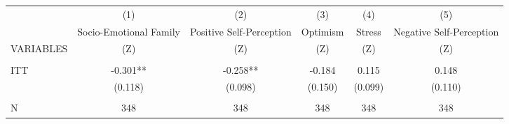 \begin{tabular}{lccccc} \hline
 & (1) & (2) & (3) & (4) & (5) \\
 & Socio-Emotional Family & Positive Self-Perception & Optimism & Stress & Negative Self-Perception \\
VARIABLES & (Z) & (Z) & (Z) & (Z) & (Z) \\ \hline
 &  &  &  &  &  \\
ITT & -0.301** & -0.258** & -0.184 & 0.115 & 0.148 \\
 & (0.118) & (0.098) & (0.150) & (0.099) & (0.110) \\
 &  &  &  &  &  \\
 N & 348 & 348 & 348 & 348 & 348 \\ \hline
\end{tabular}

